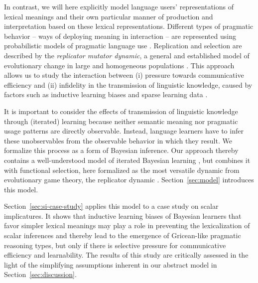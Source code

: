\documentclass[a4paper, 11pt]{article}
\theoremstyle{Satz}
\begin{document}
In contrast, we will here explicitly model language users' representations of lexical
meanings and their own particular manner of production and interpretation based on
these lexical representations. Different types of pragmatic behavior -- ways of deploying meaning in interaction -- are represented using
probabilistic models of pragmatic language use
\citep{frank+goodman:2012,FrankeJager2015:Probabilistic-p,GoodmanFrank2016:Pragmatic-Langu}. Replication
and selection are described by the \emph{replicator mutator dynamic}, a general and established
model of evolutionary change in large and homogeneous populations
\citep{Hofbauer1985:The-Selection-M,nowak+etal:2000,NowakKomarova2001:Evolution-of-Un,hofbauer+sigmund:2003,nowak:2006}. This
approach allows us to study the interaction between (i) pressure towards communicative
efficiency and (ii) infidelity in the transmission of linguistic knowledge, caused by factors
such as inductive learning biases and sparse learning data
\citep{KirbyHurford2002:The-Emergence-o,SmithKirby2003:Iterated-Learni,kirby+etal:2014}. 

It is important to consider the effects of transmission of linguistic knowledge through
(iterated) learning because neither semantic meaning nor pragmatic usage patterns are directly
observable. Instead, language learners have to infer these unobservables from the observable
behavior in which they result. We formalize this process as a form of Bayesian inference. Our
approach thereby contains a well-understood model of iterated Bayesian learning
\citep{griffiths+kalish:2005,griffiths+kalish:2007}, but combines it with functional selection,
here formalized as the most versatile dynamic from evolutionary game theory, the replicator
dynamic \citep{TaylorJonker1978:Evolutionary-St}. Section~\ref{sec:model} introduces this
model.

Section~\ref{sec:si-case-study} applies this model to a case study on scalar implicatures. It
shows that inductive learning biases of Bayesian learners that favor simpler lexical meanings
may play a role in preventing the lexicalization of scalar inferences and thereby lead to the
emergence of Gricean-like pragmatic reasoning types, but only if there is selective pressure
for communicative efficiency and learnability. The results of this study are critically
assessed in the light of the simplifying assumptions inherent in our abstract model in Section~\ref{sec:discussion}.

\end{document}
